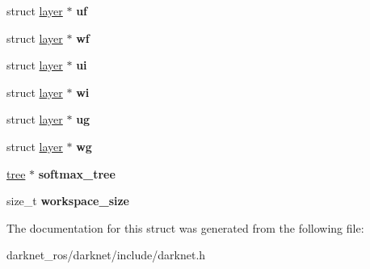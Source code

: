 \begin{DoxyCompactItemize}
\item 
\mbox{\label{structlayer_a509fb446cc0040855b530840f4cc9aad}} 
struct \hyperlink{structlayer}{layer} $\ast$ {\bfseries uf}
\item 
\mbox{\label{structlayer_a02dc5b80b7e15c4b4bd9d968ffbde662}} 
struct \hyperlink{structlayer}{layer} $\ast$ {\bfseries wf}
\item 
\mbox{\label{structlayer_ab1c06528fcb7f3a3ffedfc89db86d109}} 
struct \hyperlink{structlayer}{layer} $\ast$ {\bfseries ui}
\item 
\mbox{\label{structlayer_aea3b1b349201ba0f9234d978e2b249a8}} 
struct \hyperlink{structlayer}{layer} $\ast$ {\bfseries wi}
\item 
\mbox{\label{structlayer_ad1a598647343ef1b791891b186dc9186}} 
struct \hyperlink{structlayer}{layer} $\ast$ {\bfseries ug}
\item 
\mbox{\label{structlayer_ae2aa4b3552e0fd33370d332c3b318066}} 
struct \hyperlink{structlayer}{layer} $\ast$ {\bfseries wg}
\item 
\mbox{\label{structlayer_ada8540db939d29074a5764ac9ba92f57}} 
\hyperlink{structtree}{tree} $\ast$ {\bfseries softmax\+\_\+tree}
\item 
\mbox{\label{structlayer_afeb9d7fb2a202ef5387c135fbade83da}} 
size\+\_\+t {\bfseries workspace\+\_\+size}
\end{DoxyCompactItemize}


The documentation for this struct was generated from the following file\+:\begin{DoxyCompactItemize}
\item 
darknet\+\_\+ros/darknet/include/darknet.\+h\end{DoxyCompactItemize}
